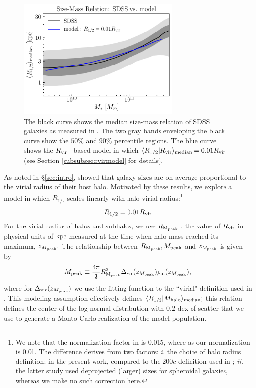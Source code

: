 \documentclass[usenatbib,usegraphicx,letterpaper]{mn2e}
\newcommand{\beq}{\begin{equation}}
\newcommand{\eeq}{\end{equation}}
\newcommand{\rhalf}{R_{1/2}}
\newcommand{\mpeak}{M_{\rm peak}}
\newcommand{\zpeak}{z_{M_{\rm peak}}}
\newcommand{\mhalo}{M_{\rm halo}}
\newcommand{\rvir}{R_{\rm vir}}
\newcommand{\rmpeak}{R_{\rm M_{peak}}}
\newcommand{\median}[2]{\langle{#1}\vert{#2}\rangle_{\rm median}}
\newcommand{\kpc}{{\rm kpc}}
\begin{document}
\begin{figure}
\centering
\includegraphics[width=8cm]{FIGS/rvir_only_rhalf_vs_mstar_sham_model.pdf}
\caption{
The black curve shows the median size-mass relation of SDSS galaxies as measured in \citet{meert_etal15}. The two gray bands enveloping the black curve show the $50\%$ and $90\%$ percentile regions. The blue curve shows the $\rvir-$based model in which $\median{\rhalf}{\rvir}=0.01\rvir$ (see Section \ref{subsubsec:rvirmodel} for details).  
}
\label{fig:scatter_plot}
\end{figure}



As noted in \S\ref{sec:intro}, \citet{kravtsov13} showed that galaxy sizes are on average proportional to the virial radius of their host halo. Motivated by these results, we  explore a model in which $\rhalf$ scales linearly with halo virial radius:\footnote{We note that the normalization factor in \citet{kravtsov13} is 0.015, where as our normalization is 0.01. The difference derives from two factors: {\em i.} the choice of halo radius definition: \citet{bryan_norman98} in the present work, compared to the $200c$ definition used in \citet{kravtsov13}; {\em ii.} the latter study used deprojected (larger) sizes for spheroidal galaxies, whereas we make no such correction here.}
\beq
\label{eq:fiducial_model}
\rhalf = 0.01\rvir
\eeq
For the virial radius of halos and subhalos, we use $\rmpeak:$ the value of $\rvir$ in physical units of $\kpc$ measured at the time when halo mass reached its maximum, $\zpeak.$  The relationship between $\rmpeak, \mpeak$ and $\zpeak$ is given by
\beq
\mpeak\equiv\frac{4\pi}{3}\rmpeak^{3}\Delta_{\rm vir}(\zpeak)\rho_{\rm m}(\zpeak),
\eeq
where for $\Delta_{\rm vir}(\zpeak)$ we use the fitting function to the ``virial" definition used in \citet{bryan_norman98}. This modeling assumption effectively defines $\median{\rhalf}{\mhalo};$ this relation defines the center of the log-normal distribution with $0.2$ dex of scatter that we use to generate a Monto Carlo realization of the model population.
\end{document}
